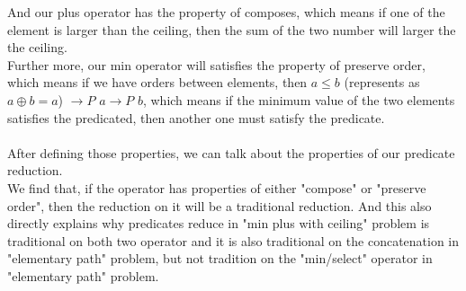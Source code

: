 \documentclass[a4paper,12pt,twoside,openright]{report}
\begin{document}
And our plus operator has the property of composes, which means if one of the element is larger than the ceiling, then the sum of the two number will larger the the ceiling.\\
Further more, our min operator will satisfies the property of preserve order, which means if we have orders between elements, then $ a \leq b$ (represents as $a \oplus b = a$) $\rightarrow P$ $a \rightarrow P$ $b$, which means if the minimum value of the two elements satisfies the predicated, then another one must satisfy the predicate.\\\\
After defining those properties, we can talk about the properties of our predicate reduction.\\
We find that, if the operator has properties of either "compose" or "preserve order", then the reduction on it will be a traditional reduction. And this also directly explains why predicates reduce in "min plus with ceiling" problem is traditional on both two operator and it is also traditional on the concatenation in "elementary path" problem, but not tradition on the "min/select" operator in "elementary path" problem.\\
\end{document}
